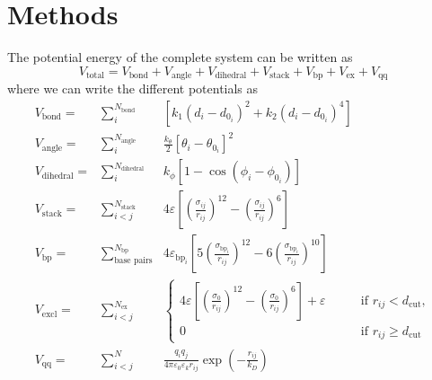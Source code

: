 \section{Methods}

The potential energy of the complete system can be written as
\begin{equation}
V_\text{total} = V_\text{bond} + V_\text{angle} + V_\text{dihedral} + V_\text{stack} + V_\text{bp} + V_\text{ex} + V_\text{qq}
\end{equation}
where we can write the different potentials as
\begin{eqnarray}
V_{\text{bond}} = &\sum_i^{N_{\text{bond}}}& \left[ k_1 \left(d_i - d_{0_i}\right)^2 + k_2 \left(d_i - d_{0_i}\right)^4\right] \\
V_\text{angle} =  &\sum_i^{N_\text{angle}}& \frac{k_\theta}{2} \left[ \theta_i - \theta_{0_i} \right]^2\\
V_\text{dihedral} =  &\sum_i^{N_\text{dihedral}}& k_\phi \left[ 1 - \cos (\phi_i - \phi_{0_i}) \right]\\
V_\text{stack} =  &\sum_{i<j}^{N_\text{stack}}& 4\varepsilon \left[ \left(\frac{\sigma_{ij}}{r_{ij}} \right)^{12} - \left(\frac{\sigma_{ij}}{r_{ij}} \right)^{6} \right]\\
V_\text{bp} =  &\sum_{\text{base pairs}}^{N_\text{bp}}& 4\varepsilon_{\text{bp}_i} \left[ 5\left(\frac{\sigma_{\text{bp}_i}}{r_{ij}} \right)^{12} - 6\left(\frac{\sigma_{\text{bp}_i}}{r_{ij}} \right)^{10} \right]\\
V_\text{excl} =  &\sum_{i<j}^{N_\text{ex}}&\begin{cases} 4\varepsilon \left[ \left(\frac{\sigma_{0}}{r_{ij}} \right)^{12} - \left(\frac{\sigma_{0}}{r_{ij}} \right)^{6} \right] + \varepsilon \qquad &\text{if }r_{ij} < d_\text{cut}, \\ 0 \qquad &\text{if }r_{ij} \geq d_\text{cut} \end{cases}\\
V_\text{qq} =&\sum_{i<j}^N & \frac{q_i q_j}{4\pi \varepsilon_0 \varepsilon_k r_{ij}} \exp \left(- \frac{r_{ij}}{k_D}  \right)
\end{eqnarray}


